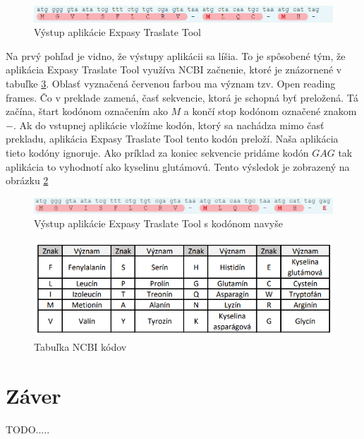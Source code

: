 \begin{figure}[!ht]
\centering
\includegraphics[scale =0.7]{obrazky-figures/appref.png}
\caption{Výstup aplikácie Expasy Traslate Tool}
\label{priklad3}
\end{figure}



Na prvý pohľad je vidno, že výstupy aplikácii sa líšia. To je spôsobené tým, že aplikácia Expasy Traslate Tool využíva NCBI začnenie, ktoré je znázornené v tabuľke \ref{kodyapp}. Oblasť vyznačená červenou farbou ma význam tzv. Open reading frames. Čo v preklade zamená, časť sekvencie, ktorá je schopná byť preložená. Tá začína, štart kodónom označením ako $M$ a končí stop kodónom označené znakom $-$. Ak do vstupnej aplikácie vložíme kodón, ktorý sa nachádza mimo časť prekladu, aplikácia Expasy Traslate Tool tento kodón preloží. Naša aplikácia tieto kodóny ignoruje. Ako príklad za koniec sekvencie pridáme kodón $GAG$ tak aplikácia to vyhodnotí ako kyselinu glutámovú. Tento výsledok je zobrazený na obrázku \ref{priklad33}

\begin{figure}[!ht]
\centering
\includegraphics[scale =0.7]{obrazky-figures/appref2.png}
\caption{Výstup aplikácie Expasy Traslate Tool s kodónom navyše}
\label{priklad33}
\end{figure}
\clearpage
\begin{figure}[ht!]
\centering
\includegraphics[scale =0.9]{obrazky-figures/kodyapp.png}
\caption{Tabuľka NCBI kódov}
\label{kodyapp}
\end{figure}


\chapter{Záver}
\label{zaver}

TODO.....






